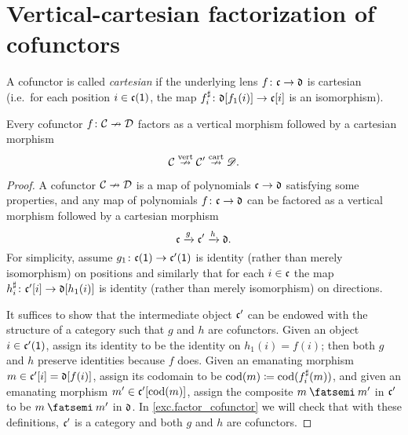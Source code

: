 \documentclass[Book-Poly]{subfiles}
\begin{document}

\section{Vertical-cartesian factorization of cofunctors}

A cofunctor is called \emph{cartesian} if the underlying lens $f\colon\mathfrak{c}\to\mathfrak{d}$ is cartesian (i.e.\ for each position $i\in\mathfrak{c}(\textsf{1})$, the map $f^\sharp_i\colon\mathfrak{d}[f_1(i)]\to\mathfrak{c}[i]$ is an isomorphism). %

\begin{proposition}\label{prop.factor_cofunctor}
Every cofunctor $f\colon\mathcal{C}\nrightarrow\mathcal{D}$ factors as a vertical morphism followed by a cartesian morphism
\[
\mathcal{C}\overset{\text{vert}}{\nrightarrow}\mathcal{C}'\overset{\text{cart}}{\nrightarrow}\mathscr{D}.
\]
\end{proposition}
\begin{proof}
A cofunctor $\mathcal{C}\nrightarrow\mathcal{D}$ is a map of polynomials $\mathfrak{c}\to\mathfrak{d}$ satisfying some properties, and any map of polynomials $f\colon\mathfrak{c}\to\mathfrak{d}$ can be factored as a vertical morphism followed by a cartesian morphism
\[
	\mathfrak{c}\xrightarrow{g}\mathfrak{c'}\xrightarrow{h}\mathfrak{d}.
\]
For simplicity, assume $g_1\colon\mathfrak{c}(\textsf{1})\to\mathfrak{c'}(\textsf{1})$ is identity (rather than merely isomorphism) on positions and similarly that for each $i\in\mathfrak{c}$ the map $h^\sharp_i\colon\mathfrak{c'}[i]\to\mathfrak{d}[h_1(i)]$ is identity (rather than merely isomorphism) on directions. 

It suffices to show that the intermediate object $\mathfrak{c'}$ can be endowed with the structure of a category such that $g$ and $h$ are cofunctors. Given an object $i\in\mathfrak{c'}(\textsf{1})$, assign its identity to be the identity on $h_1(i)=f(i)$; then both $g$ and $h$ preserve identities because $f$ does. Given an emanating morphism $m\in\mathfrak{c'}[i]=\mathfrak{d}[f(i)]$, assign its codomain to be $\operatorname{cod}(m)\coloneqq\operatorname{cod}(f^\sharp_i(m))$, and given an emanating morphism $m'\in\mathfrak{c'}[\operatorname{cod}(m)]$, assign the composite $m\then m'$ in $\mathfrak{c'}$ to be $m\then m'$ in $\mathfrak{d}$. In \cref{exc.factor_cofunctor} we will check that with these definitions, $\mathfrak{c'}$ is a category and both $g$ and $h$ are cofunctors.
\end{proof}
\end{document}
